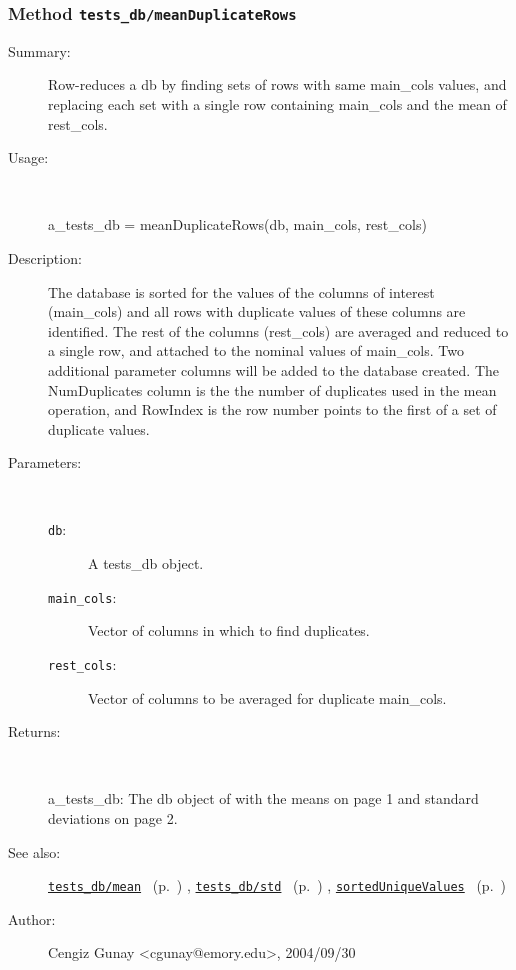 \subsubsection[Method \texttt{meanDuplicateRows}]{Method \texttt{tests\_db/meanDuplicateRows}}%
%
\label{ref_tests_db__meanDuplicateRows}%
\hypertarget{ref_tests_db__meanDuplicateRows}{}%
\begin{description}
\item[Summary:]Row-reduces a db by finding sets of rows with same main\_cols values, and replacing each set with a single row containing main\_cols and the mean of rest\_cols.
%
\item[Usage:]~%
\begin{lyxcode}%
a\_tests\_db = meanDuplicateRows(db, main\_cols, rest\_cols)
%
\end{lyxcode}%
%
\item[Description:]%
The database is sorted for the values of the columns of 
 interest (main\_cols) and all rows with duplicate values of 
 these columns are identified. The rest of the columns (rest\_cols) 
 are averaged and reduced to a single row, and attached to the
 nominal values of main\_cols. Two additional parameter columns will be added to the
 database created. The NumDuplicates column is the the number of duplicates 
 used in the mean operation, and RowIndex is the row number points 
 to the first of a set of duplicate values.
\item[Parameters:]~
\begin{description}%
\item[\texttt{db}:]
 A tests\_db object.
\item[\texttt{main\_cols}:]
 Vector of columns in which to find duplicates.
\item[\texttt{rest\_cols}:]
 Vector of columns to be averaged for duplicate main\_cols.
\end{description}%
%
\item[Returns:
]~

	a\_tests\_db: The db object of with the means on page 1 
		    and standard deviations on page 2.
%
%
\item[See also:]%
\hyperlink{ref_tests_db__mean}{\texttt{tests\_db/mean}}%
\ (p.~\pageref{ref_tests_db__mean})%
%
, \hyperlink{ref_tests_db__std}{\texttt{tests\_db/std}}%
\ (p.~\pageref{ref_tests_db__std})%
%
, \hyperlink{ref_sortedUniqueValues}{\texttt{sortedUniqueValues}}%
\ (p.~\pageref{ref_sortedUniqueValues})%
%
%
\item[Author:]%
Cengiz Gunay <cgunay@emory.edu>, 2004/09/30
%
\end{description}
\methodline%
